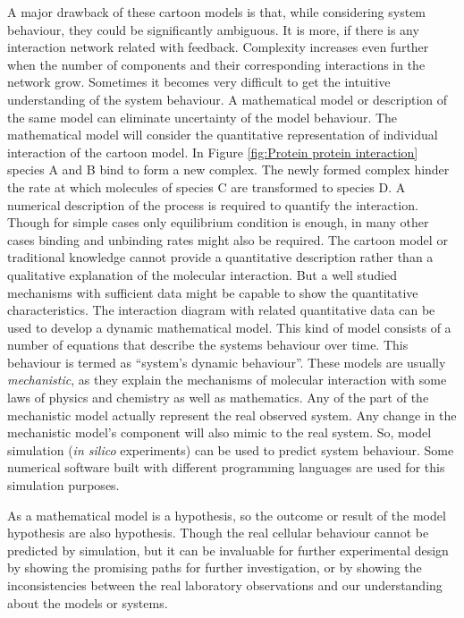 A major drawback of these cartoon models is that, while considering system behaviour, they could be significantly ambiguous. It is more, if there is any interaction network related with feedback. Complexity increases even further when the number of components and their corresponding interactions in the network grow. Sometimes it becomes very difficult to get the intuitive understanding of the system behaviour. A mathematical model or description of the same model can eliminate uncertainty of the model behaviour. The mathematical model will consider the quantitative representation of individual interaction of the cartoon model. In Figure \ref{fig:Protein protein interaction} species A and B bind to form a new complex. The newly formed complex hinder the rate at which molecules of species C are transformed to species D. A numerical description of the process is required to quantify the interaction. Though for simple cases only equilibrium condition is enough, in many other cases binding and unbinding rates might also be required. The cartoon model or traditional knowledge cannot provide a quantitative description rather than a qualitative explanation of the molecular interaction. But a well studied mechanisms with sufficient data might be capable to show the quantitative characteristics. The interaction diagram with related quantitative data can be used to develop a dynamic mathematical model. This kind of model consists of a number of equations that describe the systems behaviour over time. This behaviour is termed as ``system's dynamic behaviour''. These models are usually \textit{mechanistic}, as they explain the mechanisms of molecular interaction with some laws of physics and chemistry as well as mathematics. Any of the part of the mechanistic model actually represent the real observed system. Any change in the mechanistic model's component will also mimic to the real system. So, model simulation (\textit{in silico} experiments) can be used to predict system behaviour. Some numerical software built with different programming languages are used for this simulation purposes. 

As a mathematical model is a hypothesis, so the outcome or result of the model hypothesis are also hypothesis. Though the real cellular behaviour cannot be predicted by simulation, but it can be invaluable for further experimental design by showing the promising paths for further investigation, or by showing the inconsistencies between the real laboratory observations and our understanding about the models or systems. 

